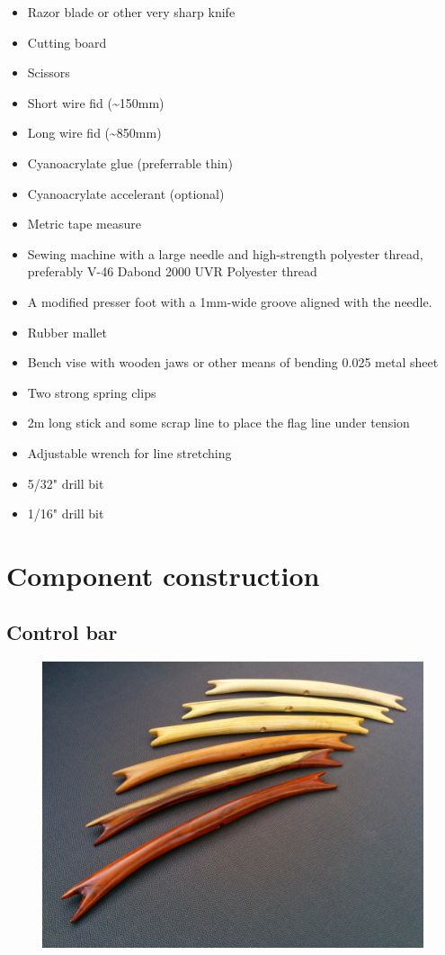 \documentclass[
]{book}
\providecommand{\tightlist}{%
  \setlength{\itemsep}{0pt}\setlength{\parskip}{0pt}}
\begin{document}
\begin{itemize}
\tightlist
\item
  Razor blade or other very sharp knife
\item
  Cutting board
\item
  Scissors
\item
  Short wire fid (\textasciitilde150mm)
\item
  Long wire fid (\textasciitilde850mm)
\item
  Cyanoacrylate glue (preferrable thin)
\item
  Cyanoacrylate accelerant (optional)
\item
  Metric tape measure
\item
  Sewing machine with a large needle and high-strength polyester thread, preferably V-46 Dabond 2000 UVR Polyester thread
\item
  A modified presser foot with a 1mm-wide groove aligned with the needle.
\item
  Rubber mallet
\item
  Bench vise with wooden jaws or other means of bending 0.025 metal sheet
\item
  Two strong spring clips
\item
  2m long stick and some scrap line to place the flag line under tension
\item
  Adjustable wrench for line stretching
\item
  5/32" drill bit
\item
  1/16" drill bit
\end{itemize}

\hypertarget{component-construction}{%
\chapter{Component construction}\label{component-construction}}

\hypertarget{control-bar}{%
\section{Control bar}\label{control-bar}}

\begin{figure}

{\centering \includegraphics[width=0.7\linewidth]{images/bare-bars} 

}

\end{figure}
\end{document}
